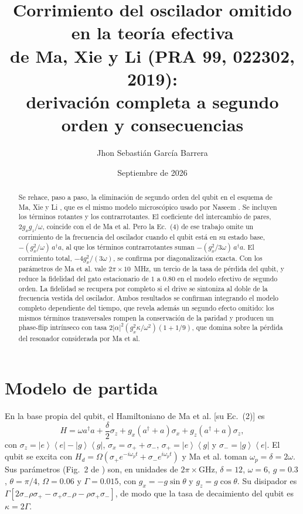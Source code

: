 \documentclass[11pt]{report}
\title{Corrimiento del oscilador omitido en la teor\'ia efectiva\\ de Ma, Xie y Li (PRA 99, 022302, 2019):\\ derivaci\'on completa a segundo orden y consecuencias}
\author{Jhon Sebasti\'an Garc\'ia Barrera}
\date{Septiembre de 2026}
\newcommand{\ket}[1]{\left|#1\right\rangle}
\newcommand{\bra}[1]{\left\langle#1\right|}
\newcommand{\spl}{\sigma_{+}}
\newcommand{\smi}{\sigma_{-}}
\newcommand{\Pe}{\ket{e}\!\bra{e}}
\newcommand{\Pg}{\ket{g}\!\bra{g}}
\begin{document}
\maketitle

\begin{abstract}
Se rehace, paso a paso, la eliminaci\'on de segundo orden del qubit en el esquema de Ma, Xie y Li \cite{Ma2019}, que es el mismo modelo microsc\'opico usado por Naseem \cite{Naseem2026}. Se incluyen los t\'erminos rotantes y los contrarrotantes. El coeficiente del intercambio de pares, $2g_{x}g_{z}/\omega$, coincide con el de Ma et al. Pero la Ec.~(4) de ese trabajo omite un corrimiento de la frecuencia del oscilador cuando el qubit est\'a en su estado base, $-(g_{x}^{2}/\omega)\,a^{\dagger}a$, al que los t\'erminos contrarrotantes suman $-(g_{x}^{2}/3\omega)\,a^{\dagger}a$. El corrimiento total, $-4g_{x}^{2}/(3\omega)$, se confirma por diagonalizaci\'on exacta. Con los par\'ametros de Ma et al. vale $2\pi\times10$~MHz, un tercio de la tasa de p\'erdida del qubit, y reduce la fidelidad del gato estacionario de $1$ a $0.80$ en el modelo efectivo de segundo orden. La fidelidad se recupera por completo si el drive se sintoniza al doble de la frecuencia vestida del oscilador. Ambos resultados se confirman integrando el modelo completo dependiente del tiempo, que revela adem\'as un segundo efecto omitido: los mismos t\'erminos transversales rompen la conservaci\'on de la paridad y producen un phase-flip intr\'inseco con tasa $2|\alpha|^{2}(g_{x}^{2}\kappa/\omega^{2})(1+1/9)$, que domina sobre la p\'erdida del resonador considerada por Ma et al.
\end{abstract}

\section{Modelo de partida}

En la base propia del qubit, el Hamiltoniano de Ma et al. [su Ec.~(2)] es
\begin{equation}
H = \omega a^{\dagger}a + \frac{\delta}{2}\sigma_{z} + g_{x}(a^{\dagger}+a)\sigma_{x} + g_{z}(a^{\dagger}+a)\sigma_{z},
\label{eq:H}
\end{equation}
con $\sigma_{z}=\Pe-\Pg$, $\sigma_{x}=\spl+\smi$, $\spl=\ket{e}\bra{g}$ y $\smi=\ket{g}\bra{e}$. El qubit se excita con $H_{d}=\Omega(\spl e^{-i\omega_{p}t}+\smi e^{i\omega_{p}t})$ y Ma et al. toman $\omega_{p}=\delta=2\omega$. Sus par\'ametros (Fig.~2 de \cite{Ma2019}) son, en unidades de $2\pi\times$GHz, $\delta=12$, $\omega=6$, $g=0.3$, $\theta=\pi/4$, $\Omega=0.06$ y $\Gamma=0.015$, con $g_{x}=-g\sin\theta$ y $g_{z}=g\cos\theta$. Su disipador es $\Gamma[2\smi\rho\spl-\spl\smi\rho-\rho\spl\smi]$, de modo que la tasa de decaimiento del qubit es $\kappa=2\Gamma$.
\end{document}

